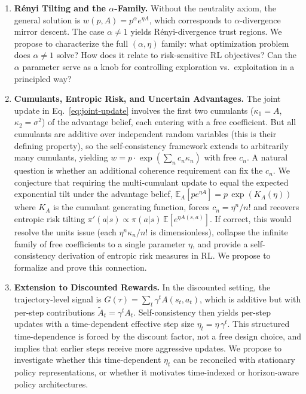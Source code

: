 \documentclass[11pt]{article}
\theoremstyle{definition}
\theoremstyle{remark}
\newcommand{\E}{\mathbb{E}}
\begin{document}
\begin{enumerate}[label=\textbf{(\arabic*)}]

\item \textbf{R\'enyi Tilting and the $\alpha$-Family.}
Without the neutrality axiom, the general solution is $w(p,A) = p^\alpha e^{\eta A}$, which corresponds to $\alpha$-divergence mirror descent. The case $\alpha \neq 1$ yields R\'enyi-divergence trust regions. We propose to characterize the full $(\alpha, \eta)$ family: what optimization problem does $\alpha \neq 1$ solve? How does it relate to risk-sensitive RL objectives? Can the $\alpha$ parameter serve as a knob for controlling exploration vs.\ exploitation in a principled way?

\item \textbf{Cumulants, Entropic Risk, and Uncertain Advantages.}
The joint update in Eq.~\eqref{eq:joint-update} involves the first two cumulants ($\kappa_1 = A$, $\kappa_2 = \sigma^2$) of the advantage belief, each entering with a free coefficient. But all cumulants are additive over independent random variables (this is their defining property), so the self-consistency framework extends to arbitrarily many cumulants, yielding $w = p \cdot \exp(\sum_n c_n \kappa_n)$ with free $c_n$. A natural question is whether an additional coherence requirement can fix the $c_n$. We conjecture that requiring the multi-cumulant update to equal the expected exponential tilt under the advantage belief, $\E_A[pe^{\eta A}] = p\,\exp(K_A(\eta))$ where $K_A$ is the cumulant generating function, forces $c_n = \eta^n / n!$ and recovers entropic risk tilting $\pi'(a|s) \propto \pi(a|s)\,\E[e^{\eta A(s,a)}]$. If correct, this would resolve the units issue (each $\eta^n \kappa_n / n!$ is dimensionless), collapse the infinite family of free coefficients to a single parameter $\eta$, and provide a self-consistency derivation of entropic risk measures in RL. We propose to formalize and prove this connection.

\item \textbf{Extension to Discounted Rewards.}
In the discounted setting, the trajectory-level signal is $G(\tau) = \sum_t \gamma^t A(s_t, a_t)$, which is additive but with per-step contributions $\tilde{A}_t = \gamma^t A_t$. Self-consistency then yields per-step updates with a time-dependent effective step size $\eta_t = \eta\,\gamma^t$. This structured time-dependence is forced by the discount factor, not a free design choice, and implies that earlier steps receive more aggressive updates. We propose to investigate whether this time-dependent $\eta_t$ can be reconciled with stationary policy representations, or whether it motivates time-indexed or horizon-aware policy architectures.


\end{enumerate}
\end{document}
